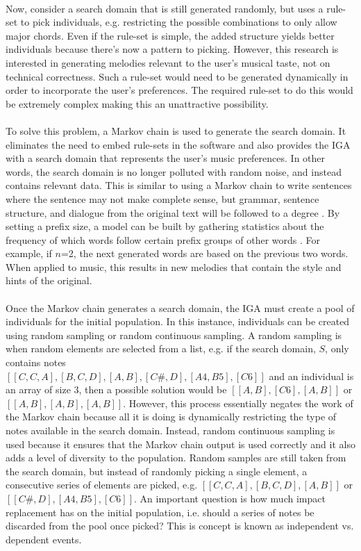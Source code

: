 \documentclass[12pt]{article} %
\begin{document}
\\
Now, consider a search domain that is still generated randomly, but uses a rule-set to pick individuals, e.g. restricting the possible combinations to only allow major chords. Even if the rule-set is simple, the added structure yields better individuals because there's now a pattern to picking. However, this research is interested in generating melodies relevant to the user's musical taste, not on technical correctness. Such a rule-set would need to be generated dynamically in order to incorporate the user's preferences. The required rule-set to do this would be extremely complex making this an unattractive possibility. \\
\\
To solve this problem, a Markov chain is used to generate the search domain. It eliminates the need to embed rule-sets in the software and also provides the IGA with a search domain that represents the user's music preferences. In other words, the search domain is no longer polluted with random noise, and instead contains relevant data. This is similar to using a Markov chain to write sentences where the sentence may not make complete sense, but grammar, sentence structure, and dialogue from the original text will be followed to a degree \cite{website:rose}. By setting a prefix size, a model can be built by gathering statistics about the frequency of which words follow certain prefix groups of other words \cite{website:rose}. For example, if $n$=2, the next generated words are based on the previous two words. When applied to music, this results in new melodies that contain the style and hints of the original. \\
\\

Once the Markov chain generates a search domain, the IGA must create a pool of individuals for the initial population. In this instance, individuals can be created using random sampling or random continuous sampling. A random sampling is when random elements are selected from a list, e.g. if the search domain, $S$, only contains notes \\
$[[C, C, A], [B, C, D], [A, B], [C\#, D], [A4, B5], [C6]]$ and an individual is an array of size 3, then a possible solution would be $[[A,  B], [C6], [A, B]]$ or $[[A, B], [A, B], [A, B]]$. However, this process essentially negates the work of the Markov chain because all it is doing is dynamically restricting the type of notes available in the search domain. Instead, random continuous sampling is used because it ensures that the Markov chain output is used correctly and it also adds a level of diversity to the population. Random samples are still taken from the search domain, but instead of randomly picking a single element, a consecutive series of elements are picked, e.g. $[[C, C, A], [B, C, D], [A, B]]$ or $[[C\#, D], [A4, B5], [C6]]$. An important question is how much impact replacement has on the initial population, i.e. should a series of notes be discarded from the pool once picked? This is concept is known as independent vs. dependent events.
\end{document}
